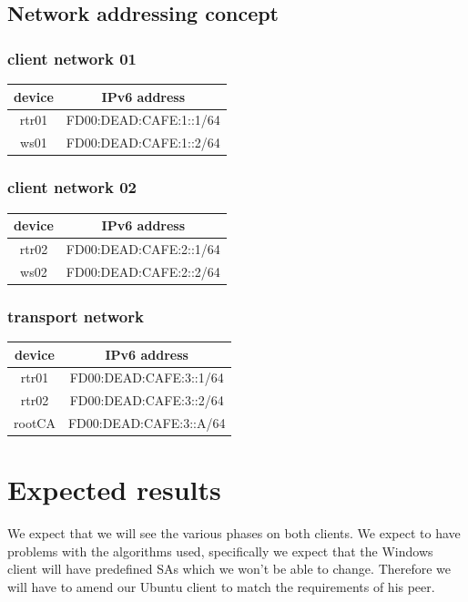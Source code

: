 \documentclass[a4paper]{report}
\begin{document}
\subsection{Network addressing concept}
\subsubsection{client network 01}
\begin{tabular}{|c|c|}
	\hline 
	\textbf{device} & \textbf{IPv6 address} \\ 
	\hline 
	rtr01 & FD00:DEAD:CAFE:1::1/64 \\ 
	\hline 
	ws01 & FD00:DEAD:CAFE:1::2/64 \\ 
	\hline 
\end{tabular} 

\subsubsection{client network 02}
\begin{tabular}{|c|c|}
	\hline 
	\textbf{device} & \textbf{IPv6 address} \\ 
	\hline 
	rtr02 & FD00:DEAD:CAFE:2::1/64 \\ 
	\hline 
	ws02 & FD00:DEAD:CAFE:2::2/64 \\ 
	\hline 
\end{tabular} 

\subsubsection{transport network}
\begin{tabular}{|c|c|}
	\hline 
	\textbf{device} & \textbf{IPv6 address} \\ 
	\hline 
	rtr01 & FD00:DEAD:CAFE:3::1/64 \\ 
	\hline 
	rtr02 & FD00:DEAD:CAFE:3::2/64 \\ 
	\hline 
	rootCA & FD00:DEAD:CAFE:3::A/64 \\ 
	\hline 
\end{tabular} 

\section{Expected results}
\label{sec:ExpectedResult}
We expect that we will see the various phases on both clients. We expect to have problems with the algorithms used, specifically we expect that the Windows client will have predefined SAs which we won't be able to change. Therefore we will have to amend our Ubuntu client to match the requirements of his peer.
\end{document}
